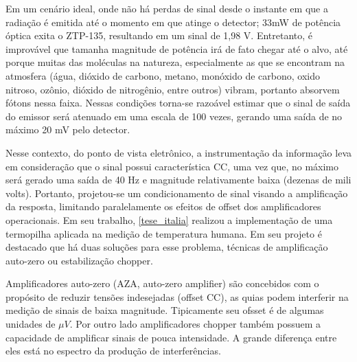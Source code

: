 \documentclass[oneside,openright,12pt]{ufsm_2021} %
\begin{document}
            \par Em um cenário ideal, onde não há perdas de sinal desde o instante em que a radiação é emitida até o momento em que atinge o detector; 33mW de potência óptica exita o ZTP-135, resultando em um sinal de 1,98 V. Entretanto, é improvável que tamanha magnitude de potência irá de fato chegar até o alvo, até porque muitas das moléculas na natureza, especialmente as que se encontram na atmosfera (água, dióxido de carbono, metano, monóxido de carbono, oxido nitroso, ozônio, dióxido de nitrogênio, entre outros) vibram, portanto absorvem fótons nessa faixa. Nessas condições torna-se razoável estimar que o sinal de saída do emissor será atenuado em uma escala de 100 vezes, gerando uma saída de no máximo 20 mV pelo detector.
            \par Nesse contexto, do ponto de vista eletrônico, a instrumentação da informação leva em consideração que o sinal possui característica CC, uma vez que, no máximo será gerado uma saída de 40 Hz e magnitude relativamente baixa (dezenas de mili volts). Portanto, projetou-se um condicionamento de sinal visando a amplificação da resposta, limitando paralelamente os efeitos de offset dos amplificadores operacionais. Em seu trabalho, \ref{tese_italia} realizou a implementação de uma termopilha aplicada na medição de temperatura humana. Em seu projeto é destacado que há duas soluções para esse problema, técnicas de amplificação auto-zero ou estabilização chopper. 
            
            \par Amplificadores auto-zero (AZA, auto-zero amplifier) são concebidos com o propósito de reduzir tensões indesejadas (offset CC), as quias podem interferir na medição de sinais de baixa magnitude. Tipicamente seu ofsset é de algumas unidades de $\mu V$. Por outro lado amplificadores chopper também possuem a capacidade de amplificar sinais de pouca intensidade. A grande diferença entre eles está no espectro da produção de interferências.
\end{document}
